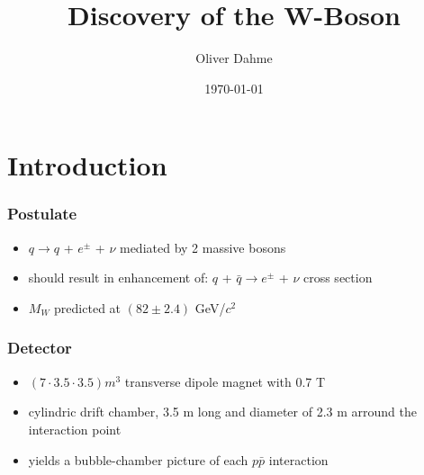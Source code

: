 \documentclass{beamer}
\title[Antineutrons]{Discovery of the W-Boson} %
\author{Oliver Dahme} %
\institute[UZH] %
{
University of Zurich \\ %
\medskip
\textit{o.dahme@cern.ch} %
}
\date{\today} %
\begin{document}
\begin{frame}
\titlepage %
\end{frame}



\section{Introduction} %

\begin{frame}
\frametitle{Postulate}
\begin{itemize}
  \item $q \rightarrow q$ + $e^\pm$ + $\nu$ mediated by 2 massive bosons
  \item should result in enhancement of: $q$ + $\bar{q} \rightarrow e^\pm$ + $\nu$ cross section
  \item $M_W$ predicted at $(82 \pm 2.4)$ GeV/$c^2$
\end{itemize}
\end{frame}

\begin{frame}
\frametitle{Detector}
\begin{itemize}
  \item $(7 \cdot 3.5 \cdot 3.5) m^3$ transverse dipole magnet with 0.7 T
  \item cylindric drift chamber, 3.5 m long and diameter of 2.3 m arround the interaction point
  \item yields a bubble-chamber picture of each $p \bar{p}$ interaction
\end{itemize}
\end{frame}
\end{document}
